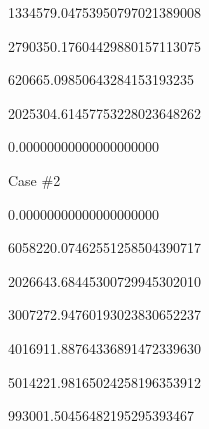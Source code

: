 \documentclass [12pt] {oblivoir}
\begin{document}
1334579.04753950797021389008

2790350.17604429880157113075

620665.09850643284153193235

2025304.61457753228023648262

0.00000000000000000000

Case \#2

0.00000000000000000000

6058220.07462551258504390717

2026643.68445300729945302010

3007272.94760193023830652237

4016911.88764336891472339630

5014221.98165024258196353912

993001.50456482195295393467
\end{document}
